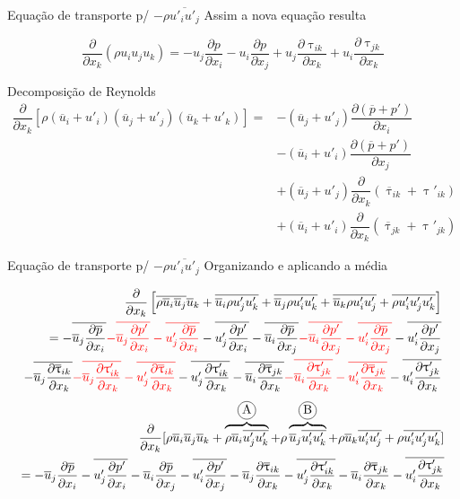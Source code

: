 \documentclass[10pt]{beamer}
\newcommand{\ddx}[2]{\dfrac{\partial #1}{\partial x_{#2}}}
\newcommand{\ddxp}[2]{\dfrac{\partial }{\partial x_{#2}}\left(#1\right)}
\newcommand{\m}[1]{\overline{#1}}
\newcommand{\red}[1]{{\color{red}#1}}
\newcommand{\incircle}[1]{{\tikz[baseline=(X.base)] \node(X)[draw, shape=circle, inner sep=0]{\strut #1};}}
\begin{document}
\begin{frame}{Equação de transporte p/ $ -\rho \m{u'_i u'_j} $}
	Assim a nova equação resulta
	
	\begin{equation*}
	\ddxp{\rho u_i u_j u_k}{k} = - u_j \ddx{p}{i} - u_i \ddx{p}{j} + u_j \ddx{\uptau_{ik}}{k} + u_i \ddx{\uptau_{jk}}{k}
	\end{equation*}
	
	Decomposição de Reynolds
	\begin{align*}
	\ddx{ }{k}\left[ \rho (\m{u}_i + u'_i) (\m{u}_j + u'_j) (\m{u}_k + u'_k) \right] = 
	&- (\m{u}_j + u'_j)\ddx{(\m{p} + p')}{i} \\ 
	&- (\m{u}_i + u'_i)\ddx{(\m{p} + p')}{j} \\
	&+ (\m{u}_j + u'_j) \ddxp{\m{\uptau}_{ik} + \uptau'_{ik}}{k} \\ 
	&+ (\m{u}_i + u'_i) \ddxp{\m{\uptau}_{jk} + \uptau'_{jk}}{k}
	\end{align*}
	
\end{frame}

\begin{frame}{Equação de transporte p/ $ -\rho \m{u'_i u'_j} $}
	Organizando e aplicando a média
	
	\begin{align*}
	\ddx{ }{k}\left[ \m{\rho \m{u}_i \m{u}_j} \m{u}_k + \m{\m{u}_i \rho u'_j u'_k} + \m{\m{u}_j \rho u'_i u'_k} + \m{\m{u}_k \rho u'_i u'_j} + \m{\rho u'_i u'_j u'_k} \right] \\
	=
	- \m{\m{u}_j \ddx{\m{p}}{i}} \red{- \m{\m{u}_j \ddx{p'}{i}} - \m{u'_j \ddx{\m{p}}{i}}} - \m{u'_j \ddx{p'}{i}}
	- \m{\m{u}_i \ddx{\m{p}}{j}} \red{- \m{\m{u}_i \ddx{p'}{j}} - \m{u'_i \ddx{\m{p}}{j}}} - \m{u'_i \ddx{p'}{j}} \\
	- \m{\m{u}_j \ddx{\m{\uptau}_{ik}}{k}} \red{- \m{\m{u}_j \ddx{\uptau'_{ik}}{k}} - \m{u'_j \ddx{\m{\uptau}_{ik}}{k}}} - \m{u'_j \ddx{\uptau'_{ik}}{k}}
	- \m{\m{u}_i \ddx{\m{\uptau}_{jk}}{k}} \red{- \m{\m{u}_i \ddx{\uptau'_{jk}}{k}} - \m{u'_i \ddx{\m{\uptau}_{jk}}{k}}} - \m{u'_i \ddx{\uptau'_{jk}}{k}}
	\end{align*}
	\begin{align}\label{eq:RSMinst}
	\ddx{ }{k}[ \rho \m{u}_i \m{u}_j \m{u}_k + \overbrace{\rho \m{u}_i \m{u'_j u'_k}}^{\incircle{A}} + \rho \overbrace{\m{u}_j \m{u'_i u'_k}}^{\incircle{B}} + \rho \m{u}_k \m{u'_i u'_j} + \rho \m{u'_i u'_j u'_k} ] \nonumber \\
	=
	- \m{u}_j \ddx{\m{p}}{i} - \m{u'_j \ddx{p'}{i}}
	- \m{u}_i \ddx{\m{p}}{j} - \m{u'_i \ddx{p'}{j}}
	- \m{u}_j \ddx{\m{\uptau}_{ik}}{k} - \m{u'_j \ddx{\uptau'_{ik}}{k}}
	- \m{u}_i \ddx{\m{\uptau}_{jk}}{k} - \m{u'_i \ddx{\uptau'_{jk}}{k}}
	\end{align}
\end{frame}
\end{document}
